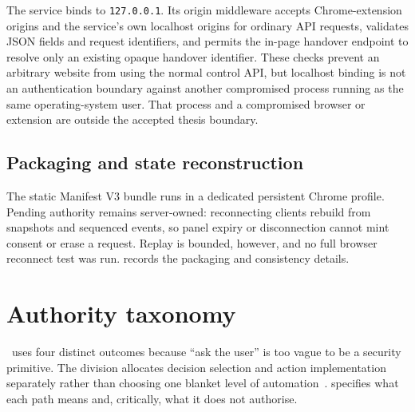 The service binds to \texttt{127.0.0.1}. Its origin middleware accepts
Chrome-extension origins and the service's own localhost origins for ordinary
API requests, validates JSON fields and request identifiers, and permits the
in-page handover endpoint to resolve only an existing opaque handover
identifier. These checks prevent an arbitrary website from using the normal
control API, but localhost binding is not an authentication boundary against
another compromised process running as the same operating-system user. That
process and a compromised browser or extension are outside the accepted thesis
boundary.

\subsection{Packaging and state reconstruction}

The static Manifest V3 bundle runs in a dedicated persistent Chrome profile.
Pending authority remains server-owned: reconnecting clients rebuild from
snapshots and sequenced events, so panel expiry or disconnection cannot mint
consent or erase a request. Replay is bounded, however, and no full browser
reconnect test was run.  records the
packaging and consistency details.

\section{Authority taxonomy}

\systemname\ uses four distinct outcomes because ``ask the user'' is too vague
to be a security primitive. The division allocates decision selection and
action implementation separately rather than choosing one blanket level of
automation~\cite{parasuraman2000automation}.
 specifies what each path means and, critically,
what it does not authorise.

